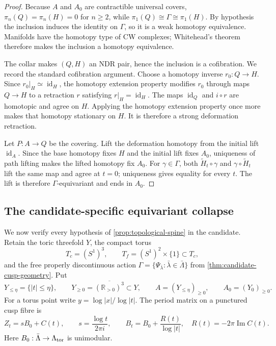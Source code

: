 \begin{proof}
Because $A$ and $A_0$ are contractible universal covers,
$\pi_n(Q)=\pi_n(H)=0$ for $n\ge2$, while
$\pi_1(Q)\cong\Gamma\cong\pi_1(H)$.  By hypothesis the inclusion induces the
identity on $\Gamma$, so it is a weak homotopy equivalence.  Manifolds have
the homotopy type of CW complexes; Whitehead's theorem
\cite[Theorem~4.5]{Hatcher2002} therefore makes the inclusion a homotopy
equivalence.

The collar makes $(Q,H)$ an NDR pair, hence the inclusion is a cofibration.
We record the standard cofibration argument.  Choose a homotopy inverse
$r_0:Q\to H$.  Since $r_0|_H\simeq\operatorname{id}_H$, the homotopy
extension property modifies $r_0$ through maps $Q\to H$ to a retraction
$r$ satisfying $r|_H=\operatorname{id}_H$.  The maps
$\operatorname{id}_Q$ and $i\circ r$ are homotopic and agree on $H$.
Applying the homotopy extension property once more makes that homotopy
stationary on $H$.  It is therefore a strong deformation retraction.

Let $P:A\to Q$ be the covering.  Lift the deformation homotopy from the
initial lift $\operatorname{id}_A$.  Since the base homotopy fixes $H$ and
the initial lift fixes $A_0$, uniqueness of path lifting makes the lifted
homotopy fix $A_0$.  For $\gamma\in\Gamma$, both
$\widetilde H_t\circ\gamma$ and $\gamma\circ\widetilde H_t$ lift the same
map and agree at $t=0$; uniqueness gives equality for every $t$.  The lift is
therefore $\Gamma$-equivariant and ends in $A_0$.
\end{proof}

\subsection{The candidate-specific equivariant collapse}

We now verify every hypothesis of \cref{prop:topological-spine} in the
candidate.  Retain the toric threefold $Y$, the compact torus
\[
 T_c=(S^1)^3,\qquad T_f=(S^1)^2\times\{1\}\subset T_c,
\]
and the free properly discontinuous action
$\Gamma=\{\Psi_{\bar\lambda}:\bar\lambda\in\bar\Lambda\}$ from
\cref{thm:candidate-cusp-geometry}.  Put
\[
 Y_{\leq\eta}=\{|t|\leq\eta\},\qquad
 Y_{\geq0}=\overline{(\mathbb R_{>0})^3}\subset Y,\qquad
 A=(Y_{\leq\eta})_{\geq0},\qquad A_0=(Y_0)_{\geq0}.
\tag{C.1}
\]
For a torus point write $y=\log|x|/\log|t|$.  The period matrix on a
punctured cusp fibre is
\[
 Z_t=sB_0+C(t),\qquad s=\frac{\log t}{2\pi i},\qquad
 B_t=B_0+\frac{R(t)}{\log|t|},\quad R(t)=-2\pi\operatorname{Im}C(t).
\tag{C.2}
\]
Here $B_0:\bar\Lambda\to\Lambda_{\rm tor}$ is unimodular.

